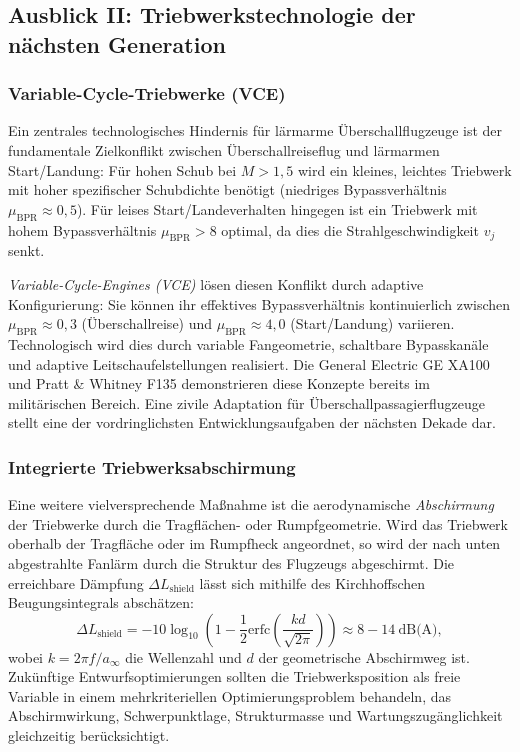 ﻿\documentclass[12pt,a4paper]{article}
\theoremstyle{definition}
\theoremstyle{remark}
\begin{document}
\subsection{Ausblick II: Triebwerkstechnologie der nächsten Generation}
\label{sec:ausblick_triebwerk}

\subsubsection{Variable-Cycle-Triebwerke (VCE)}

Ein zentrales technologisches Hindernis für lärmarme Überschallflugzeuge ist der
fundamentale Zielkonflikt zwischen Überschallreiseflug und lärmarmen Start/Landung:
Für hohen Schub bei $M > 1{,}5$ wird ein kleines, leichtes Triebwerk mit hoher
spezifischer Schubdichte benötigt (niedriges Bypassverhältnis $\mu_\text{BPR} \approx 0{,}5$).
Für leises Start/Landeverhalten hingegen ist ein Triebwerk mit hohem Bypassverhältnis
$\mu_\text{BPR} > 8$ optimal, da dies die Strahlgeschwindigkeit $v_j$ senkt.

\emph{Variable-Cycle-Engines (VCE)} lösen diesen Konflikt durch adaptive Konfigurierung:
Sie können ihr effektives Bypassverhältnis kontinuierlich zwischen $\mu_\text{BPR} \approx 0{,}3$
(Überschallreise) und $\mu_\text{BPR} \approx 4{,}0$ (Start/Landung) variieren. Technologisch
wird dies durch variable Fangeometrie, schaltbare Bypasskanäle und adaptive
Leitschaufelstellungen realisiert. Die General Electric GE XA100 und Pratt \& Whitney
F135 demonstrieren diese Konzepte bereits im militärischen Bereich. Eine zivile Adaptation
für Überschallpassagierflugzeuge stellt eine der vordringlichsten Entwicklungsaufgaben der
nächsten Dekade dar.

\subsubsection{Integrierte Triebwerksabschirmung}

Eine weitere vielversprechende Maßnahme ist die aerodynamische \emph{Abschirmung} der
Triebwerke durch die Tragflächen- oder Rumpfgeometrie. Wird das Triebwerk oberhalb der
Tragfläche oder im Rumpfheck angeordnet, so wird der nach unten abgestrahlte
Fanlärm durch die Struktur des Flugzeugs abgeschirmt. Die erreichbare Dämpfung
$\Delta L_\text{shield}$ lässt sich mithilfe des Kirchhoffschen Beugungsintegrals abschätzen:
\begin{equation}
  \Delta L_\text{shield} = -10 \log_{10}\!\left(1 - \frac{1}{2}\mathrm{erfc}\!\left(
      \frac{kd}{\sqrt{2\pi}}\right)\right) \approx 8{-}14\ \text{dB(A)},
  \label{eq:abschirmung}
\end{equation}
wobei $k = 2\pi f/a_\infty$ die Wellenzahl und $d$ der geometrische Abschirmweg ist.
Zukünftige Entwurfsoptimierungen sollten die Triebwerksposition als freie Variable
in einem mehrkriteriellen Optimierungsproblem behandeln, das Abschirmwirkung,
Schwerpunktlage, Strukturmasse und Wartungszugänglichkeit gleichzeitig berücksichtigt.
\end{document}
